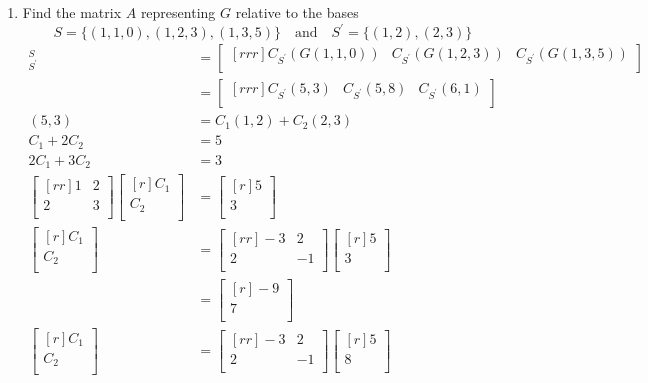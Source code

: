 \documentclass[12pt]{article}
\theoremstyle{definition}
\theoremstyle{plain}
\begin{document}
\begin{enumerate}
\begin{enumerate}
	\item Find the matrix $A$ representing $G$ relative to the bases
	\[ S=\{(1,1,0),(1,2,3),(1,3,5)\} \quad \mathrm{and} \quad S^\prime = \{(1,2),(2,3)\} \]
		\begin{align*}
		[G]_{S^\prime}^S&=\begin{bmatrix}[rrr]C_{S^\prime}(G(1,1,0)) & C_{S^\prime}(G(1,2,3)) & 		C_{S^\prime}(G(1,3,5))\\\end{bmatrix}\\
		&= \begin{bmatrix}[rrr]C_{S^\prime}(5,3) & C_{S^\prime}(5,8) & C_{S^\prime}(6,1)\\	\end{bmatrix}\\
		(5,3)&=C_1(1,2)+C_2(2,3)\\
		C_1+2C_2&=5\\
		2C_1+3C_2&=3\\
		\begin{bmatrix}[rr]1&2\\2&3\\\end{bmatrix}\begin{bmatrix}[r]C_1\\C_2\\\end{bmatrix}&=	\begin{bmatrix}[r]5\\3\\\end{bmatrix}\\
		\begin{bmatrix}[r]C_1\\C_2\\\end{bmatrix}&=\begin{bmatrix}[rr]-3&2\\2&-1\\	\end{bmatrix}\begin{bmatrix}[r]5\\3\\\end{bmatrix}\\
		&= \begin{bmatrix}[r]-9\\7\\\end{bmatrix}\\
		\begin{bmatrix}[r]C_1\\C_2\\\end{bmatrix}&=\begin{bmatrix}[rr]-3&2\\2&-1\\\end{bmatrix}\begin{bmatrix}[r]5\\8\\\end{bmatrix}\\

\end{align*}
\end{enumerate}
\end{enumerate}
\end{document}
